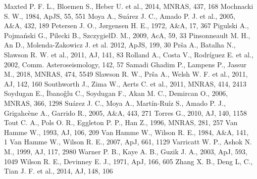 \documentclass[useAMS,usenatbib,usegraphicx]{mn2e}
\begin{document}
\begin{thebibliography}{99}
 Maxted P. F. L., Bloemen S., Heber U. et al., 2014, MNRAS, 437, 168
 Mochnacki S. W., 1984, ApJS, 55, 551
 Moya A., Su\'arez J. C., Amado P. J. et al., 2005, A\&A, 432, 189
 Petersen J. O., J\o rgensen H. E., 1972, A\&A, 17, 367
 Pigulski A., Pojma\'nski G., Pilecki B., Szczygie\l D. M., 2009, AcA, 59, 33
 Pinsonneault M. H., An D., Molenda-Zakowicz J. et al. 2012, ApJS, 199, 30
 Pr\v sa A., Batalha N., Slawson R. W. et al., 2011, AJ, 141, 83
 Rolland A., Costa V., Rodr\'iguez E. et al., 2002, Comm. Asteroseismology, 142, 57
 Samadi Ghadim P., Lampens P., Jassur M., 2018, MNRAS, 474, 5549
 Slawson R. W., Pr\v sa A., Welsh W. F. et al., 2011, AJ, 142, 160
 Southworth J., Zima W., Aerts C. et al., 2011, MNRAS, 414, 2413
 Soydugan E., \. Ibano\v{g}lu C., Soydugan F., Akan M. C., Demircan O., 2006, MNRAS, 366, 1298
 Su\'arez J. C., Moya A., Mart\'in-Ru\'iz S., Amado P. J., Grigahc\`ene A., Garrido R., 2005, A\&A, 443, 271
 Torres G., 2010, AJ, 140, 1158
 Tout C. A., Pols O. R., Eggleton P. P., Han Z., 1996, MNRAS, 281, 257
 Van Hamme W., 1993, AJ, 106, 209
 Van Hamme W., Wilson R. E., 1984, A\&A, 141, 1 
 Van Hamme W., Wilson R. E., 2007, ApJ, 661, 1129
 Varricatt W. P., Ashok N. M., 1999, AJ, 117, 2980
 Warner P. B., Kaye A. B., Guzik J. A., 2003, ApJ, 593, 1049
 Wilson R. E., Devinney E. J., 1971, ApJ, 166, 605
 Zhang X. B., Deng L, C., Tian J. F. et al., 2014, AJ, 148, 106
\end{thebibliography}
\end{document}
